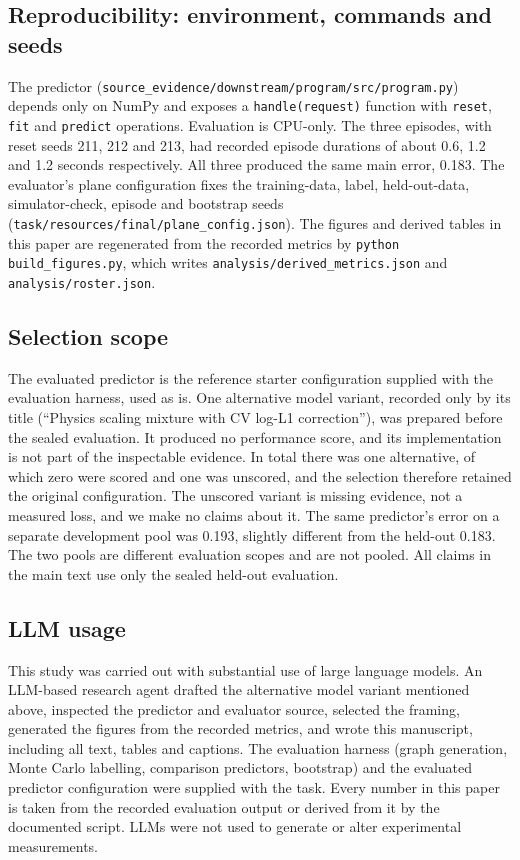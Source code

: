 \documentclass{article}
\begin{document}
\subsection{Reproducibility: environment, commands and seeds}
\label{sec:si_repro}
The predictor (\texttt{source\_evidence/downstream/program/src/program.py}) depends only on NumPy and exposes a \texttt{handle(request)} function with \texttt{reset}, \texttt{fit} and \texttt{predict} operations. Evaluation is CPU-only. The three episodes, with reset seeds 211, 212 and 213, had recorded episode durations of about 0.6, 1.2 and 1.2 seconds respectively. All three produced the same main error, 0.183. %
The evaluator's plane configuration fixes the training-data, label, held-out-data, simulator-check, episode and bootstrap seeds (\texttt{task/resources/final/plane\_config.json}). The figures and derived tables in this paper are regenerated from the recorded metrics by \texttt{python build\_figures.py}, which writes \texttt{analysis/derived\_metrics.json} and \texttt{analysis/roster.json}.

\subsection{Selection scope}
\label{sec:si_scope}
The evaluated predictor is the reference starter configuration supplied with the evaluation harness, used as is. One alternative model variant, recorded only by its title (``Physics scaling mixture with CV log-L1 correction''), was prepared before the sealed evaluation. It produced no performance score, and its implementation is not part of the inspectable evidence. %
In total there was one alternative, of which zero were scored and one was unscored, and the selection therefore retained the original configuration. The unscored variant is missing evidence, not a measured loss, and we make no claims about it. The same predictor's error on a separate development pool was 0.193, slightly different from the held-out 0.183. The two pools are different evaluation scopes and are not pooled. %
All claims in the main text use only the sealed held-out evaluation.

\subsection{LLM usage}
\label{sec:llm}
This study was carried out with substantial use of large language models. An LLM-based research agent drafted the alternative model variant mentioned above, inspected the predictor and evaluator source, selected the framing, generated the figures from the recorded metrics, and wrote this manuscript, including all text, tables and captions. The evaluation harness (graph generation, Monte Carlo labelling, comparison predictors, bootstrap) and the evaluated predictor configuration were supplied with the task. Every number in this paper is taken from the recorded evaluation output or derived from it by the documented script. LLMs were not used to generate or alter experimental measurements.
\end{document}

